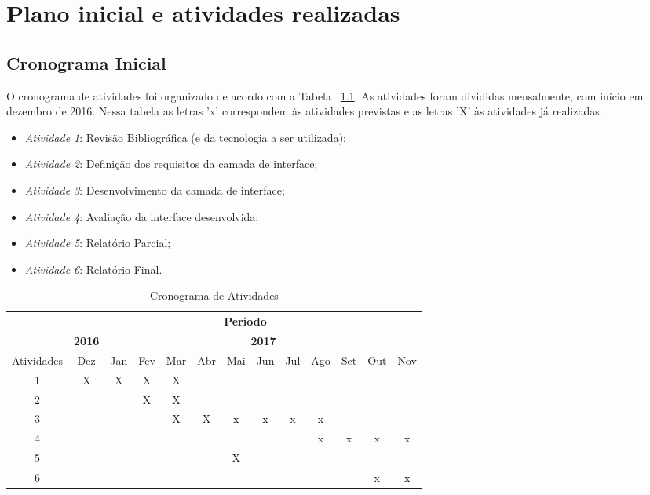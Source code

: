 \chapter{Plano inicial e atividades realizadas}
\label{ch:plano_atividades}

\section{Cronograma Inicial}
O cronograma de atividades foi organizado de acordo com a Tabela ~\ref{tab_cronograma}. As atividades foram divididas mensalmente, com início em dezembro de 2016. Nessa tabela as letras 'x' correspondem às atividades previstas e as letras 'X' às atividades já realizadas.

\begin{itemize}
\item \textit{Atividade 1}: Revisão Bibliográfica (e da tecnologia a ser utilizada);
\item \textit{Atividade 2}: Definição dos requisitos da camada de interface;
\item \textit{Atividade 3}: Desenvolvimento da camada de interface;
\item \textit{Atividade 4}: Avaliação da interface desenvolvida;
\item \textit{Atividade 5}: Relatório Parcial;
\item \textit{Atividade 6}: Relatório Final.

\end{itemize}


\begin{table}[htbp]
\centering 
\caption{Cronograma de Atividades}
\label{tab_cronograma}
\small
\begin{tabular}
{|c|c|c|c|c|c|c|c|c|c|c|c|c|} \cline{2-13}
\multicolumn{1}{c|}{}&\multicolumn{12}{c|}{\textbf{Período}}
 \\
\cline{2-13}
\multicolumn{1}{c|}{}&\multicolumn{1}{c|}{\textbf{2016}} &\multicolumn{11}{c|}{\textbf{2017}} \\
\hline Atividades & Dez & Jan & Fev & Mar & Abr & Mai & Jun & Jul & Ago & Set & Out & Nov \\
\hline         1  & X   & X   &  X  &  X  &     &     &     &     &     &     &     &     \\
\hline         2  &     &     &  X  &  X  &     &     &     &     &     &     &     &     \\
\hline         3  &     &     &     &  X  & X   &  x  &  x  & x   & x   &     &     &     \\
\hline         4  &     &     &     &     &     &     &     &     & x   & x   &  x  &  x  \\
\hline         5  &     &     &     &     &     &  X  &     &     &     &     &     &     \\
\hline         6  &     &     &     &     &     &     &     &     &     &     &   x &  x  \\
\hline
\end{tabular}
\normalsize
\end{table}

